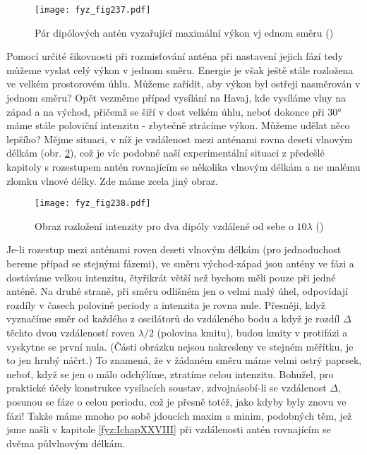 {    \begin{figure}[ht!] %
      \centering
      \texttt{[image: fyz\_fig237.pdf]}
      \caption{Pár dipólových antén vyzařující maximální výkon vj ednom směru
               (\cite[s.~384]{Feynman01})}
      \label{fyz:fig237}
    \end{figure}
    
    Pomocí určité šikovnosti při rozmisťování anténa při nastavení jejich fází tedy můžeme vyslat 
    celý výkon v jednom směru. Energie je však ještě stále rozložena ve velkém prostorovém úhlu. 
    Můžeme zařídit, aby výkon byl ostřeji nasměrován v jednom směru? Opět vezměme případ vysílání 
    na Havaj, kde vysíláme vlny na západ a na východ, přičemž se šíří v dost velkém úhlu, neboť 
    dokonce při \ang{30} máme stále poloviční intenzitu - zbytečně ztrácíme výkon. Můžeme udělat 
    něco lepšího? Mějme situaci, v níž je vzdálenost mezi anténami rovna deseti vlnovým délkám 
    (obr. \ref{fyz:fig238}), což je víc podobné naší experimentální situaci z předešlé kapitoly s 
    rozestupem antén rovnajícím se několika vlnovým délkám a ne malému zlomku vlnové délky. Zde 
    máme zcela jiný obraz.
    
    \begin{figure}[ht!] %
      \centering
      \texttt{[image: fyz\_fig238.pdf]}
      \caption{ Obraz rozložení intenzity pro dva dipóly vzdálené od sebe o \(10\lambda\)
               (\cite[s.~385]{Feynman01})}
      \label{fyz:fig238}
    \end{figure}
    
    Je-li rozestup mezi anténami roven deseti vlnovým délkám (pro jednoduchost bereme případ se 
    stejnými fázemi), ve směru východ-západ jsou antény ve fázi a dostáváme velkou intenzitu, 
    čtyřikrát větší než bychom měli pouze při jedné anténě. Na druhé straně, při směru odlišném jen 
    o velmi malý úhel, odpovídají rozdíly v časech polovině periody a intenzita je rovna nule. 
    Přesněji, když vyznačíme směr od každého z oscilátorů do vzdáleného bodu a když je rozdíl 
    \(\Delta\) těchto dvou vzdáleností roven \(\lambda/2\) (polovina kmitu), budou kmity v 
    protifázi a vyskytne se první nula. (Části obrázku nejsou nakresleny ve stejném měřítku, je to 
    jen hrubý náčrt.) To znamená, že v žádaném směru máme velmi ostrý paprsek, neboť, když se jen o 
    málo odchýlíme, ztratíme celou intenzitu. Bohužel, pro praktické účely konstrukce vysílacích 
    soustav, zdvojnásobí-li se vzdálenost \(\Delta\), posunou se fáze o celou periodu, což je 
    přesně totéž, jako kdyby byly znovu ve fázi! Takže máme mnoho po sobě jdoucích maxim a minim, 
    podobných těm, jež jsme našli v kapitole \ref{fyz:IchapXXVIII} při vzdálenosti antén rovnajícím 
    se dvěma půlvlnovým délkám.
    
}
